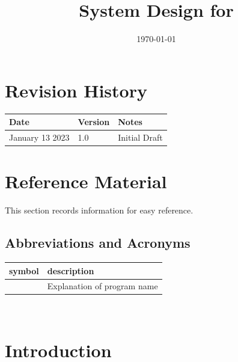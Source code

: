 \documentclass[12pt, titlepage]{article}
\begin{document}
	
	\title{System Design for \progname{}} 
	\author{\authname}
	\date{\today}
	
	\maketitle
	
	
	\section{Revision History}
	
	\begin{tabularx}{\textwidth}{p{3cm}p{2cm}X}
		\toprule {\bf Date} & {\bf Version} & {\bf Notes}\\
		\midrule
		January 13 2023 & 1.0 & Initial Draft\\
		\bottomrule
	\end{tabularx}
	
	\newpage
	
	\section{Reference Material}
	
	This section records information for easy reference.
	
	\subsection{Abbreviations and Acronyms}
	
	\renewcommand{\arraystretch}{1.2}
	\begin{tabular}{l l} 
		\toprule		
		\textbf{symbol} & \textbf{description}\\
		\midrule 
		\progname & Explanation of program name\\
		\bottomrule
	\end{tabular}\\
	
	\newpage
	
	\tableofcontents
	
	\newpage
	
	\listoftables
	
	\listoffigures
	
	\newpage
	
	
	\section{Introduction}
	
\end{document}
